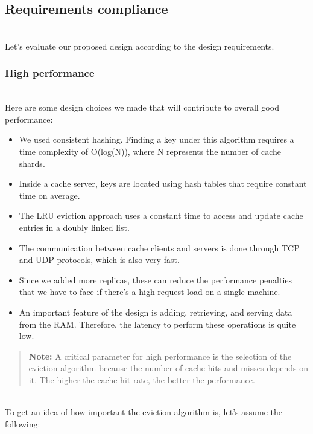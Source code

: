 

\subsection{Requirements compliance}\label{_OYbt66lGf3C0LxA1BmHu}
\\
Let's evaluate our proposed design according to the design requirements.

\subsubsection{High performance}\label{U3PG1CHOCOhxeBed7vP_r}
\\
Here are some design choices we made that will contribute to overall good performance:

\begin{itemize}
\item
\protect{}\label{T66YeTpzdTvvIxEInCxld}
We used consistent hashing. Finding a key under this algorithm requires a time complexity of O(log(N)), where N represents the number of cache shards.
\item
\protect{}\label{rij2hWJi_4UzdssONiKH8}
Inside a cache server, keys are located using hash tables that require constant time on average.
\item
\protect{}\label{zmuP_pWpDg3IXZtw7cx3k}
The LRU eviction approach uses a constant time to access and update cache entries in a doubly linked list.
\item
\protect{}\label{HOlWB8Jw5UuqO6q4MQA0q}
The communication between cache clients and servers is done through TCP and UDP protocols, which is also very fast.
\item
\protect{}\label{hzvnjJwtuJ9EFRgo7j2sY}
Since we added more replicas, these can reduce the performance penalties that we have to face if there's a high request load on a single machine.
\item
\protect{}\label{2LApy7w3yErF5B5QLdH6d}
An important feature of the design is adding, retrieving, and serving data from the RAM. Therefore, the latency to perform these operations is quite low.
\end{itemize}
\begin{quote}
\textbf{Note:} A critical parameter for high performance is the selection of the eviction algorithm because the number of cache hits and misses depends on it. The higher the cache hit rate, the better the performance.
\end{quote}
\\
To get an idea of how important the eviction algorithm is, let's assume the following:

